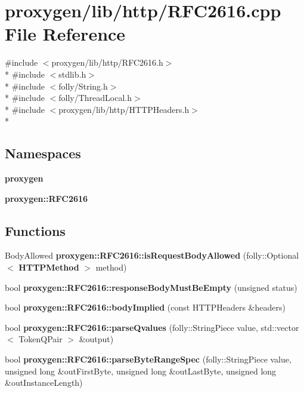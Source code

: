 \section{proxygen/lib/http/\+R\+F\+C2616.cpp File Reference}
\label{RFC2616_8cpp}
{\ttfamily \#include $<$proxygen/lib/http/\+R\+F\+C2616.\+h$>$}\\*
{\ttfamily \#include $<$stdlib.\+h$>$}\\*
{\ttfamily \#include $<$folly/\+String.\+h$>$}\\*
{\ttfamily \#include $<$folly/\+Thread\+Local.\+h$>$}\\*
{\ttfamily \#include $<$proxygen/lib/http/\+H\+T\+T\+P\+Headers.\+h$>$}\\*
\subsection*{Namespaces}
\begin{DoxyCompactItemize}
\item 
 {\bf proxygen}
\item 
 {\bf proxygen\+::\+R\+F\+C2616}
\end{DoxyCompactItemize}
\subsection*{Functions}
\begin{DoxyCompactItemize}
\item 
Body\+Allowed {\bf proxygen\+::\+R\+F\+C2616\+::is\+Request\+Body\+Allowed} (folly\+::\+Optional$<$ {\bf H\+T\+T\+P\+Method} $>$ method)
\item 
bool {\bf proxygen\+::\+R\+F\+C2616\+::response\+Body\+Must\+Be\+Empty} (unsigned status)
\item 
bool {\bf proxygen\+::\+R\+F\+C2616\+::body\+Implied} (const H\+T\+T\+P\+Headers \&headers)
\item 
bool {\bf proxygen\+::\+R\+F\+C2616\+::parse\+Qvalues} (folly\+::\+String\+Piece value, std\+::vector$<$ Token\+Q\+Pair $>$ \&output)
\item 
bool {\bf proxygen\+::\+R\+F\+C2616\+::parse\+Byte\+Range\+Spec} (folly\+::\+String\+Piece value, unsigned long \&out\+First\+Byte, unsigned long \&out\+Last\+Byte, unsigned long \&out\+Instance\+Length)
\end{DoxyCompactItemize}
